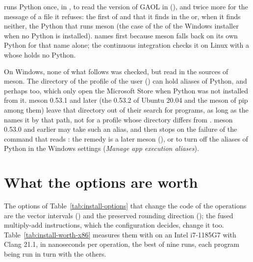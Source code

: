 \documentclass[12pt,a4paper,twoside,openright]{book}
\begin{document}
\medskip
{} runs Python once, in , to read the version
of GAOL in  (), and twice more
for the message of a file it refuses: the first of  and
 that it finds in the  or, when it finds neither, the
Python that runs meson (the case of the  of the Windows
installer when no Python is installed).  names
 first because meson falls back on its own Python for that name
alone; the continuous integration checks it on Linux with a 
whose  holds no Python.

\begin{Rem}
On Windows, none of what follows was checked, but read in the sources of
meson. The directory  of the profile of the user
()
can hold aliases of Python,  and perhaps 
too, which only open the Microsoft Store when Python was not installed from
it. meson 0.53.1 and later (the 0.53.2 of Ubuntu 20.04 and the meson of pip
among them) leave that directory out of their search for programs, as long as
the  names it by that path, not for a profile whose directory
differs from . meson 0.53.0 and earlier may take such an
alias, and  then stops on the failure of the command that
reads : the remedy is a later meson
(), or to turn off the aliases of Python in the
Windows settings (\emph{Manage app execution aliases}).
\end{Rem}

\section{What the options are worth}\label{sec:install-options-worth}

The options of Table~\ref{tab:install-options} that change the code of the
operations are the vector intervals () and the preserved
rounding direction (); the fused
multiply-add instructions, which the configuration decides, change it too.
Table~\ref{tab:install-worth-x86} measures them with
 on an Intel i7-1185G7 with Clang 21.1, in
nanoseconds per operation, the best of nine runs, each program being run in
turn with the others.
\end{document}
